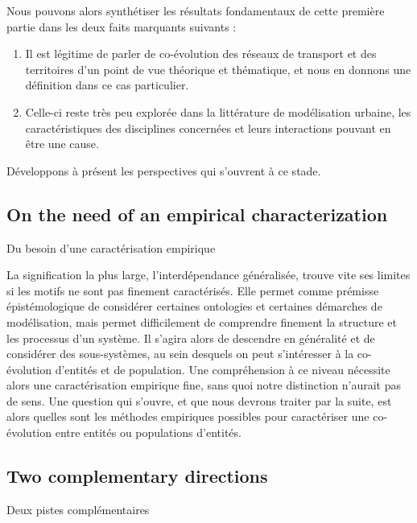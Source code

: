 Nous pouvons alors synthétiser les résultats fondamentaux de cette première partie dans les deux faits marquants suivants :
\begin{enumerate}
	\item Il est légitime de parler de co-évolution des réseaux de transport et des territoires d'un point de vue théorique et thématique, et nous en donnons une définition dans ce cas particulier.
	\item Celle-ci reste très peu explorée dans la littérature de modélisation urbaine, les caractéristiques des disciplines concernées et leurs interactions pouvant en être une cause.
\end{enumerate}

Développons à présent les perspectives qui s'ouvrent à ce stade.


\subsection*{On the need of an empirical characterization}{Du besoin d'une caractérisation empirique}

La signification la plus large, l'interdépendance généralisée, trouve vite ses limites si les motifs ne sont pas finement caractérisés. Elle permet comme prémisse épistémologique de considérer certaines ontologies et certaines démarches de modélisation, mais permet difficilement de comprendre finement la structure et les processus d'un système. Il s'agira alors de descendre en généralité et de considérer des sous-systèmes, au sein desquels on peut s'intéresser à la co-évolution d'entités et de population. Une compréhension à ce niveau nécessite alors une caractérisation empirique fine, sans quoi notre distinction n'aurait pas de sens. Une question qui s'ouvre, et que nous devrons traiter par la suite, est alors quelles sont les méthodes empiriques possibles pour caractériser une co-évolution entre entités ou populations d'entités.


\subsection*{Two complementary directions}{Deux pistes complémentaires}




